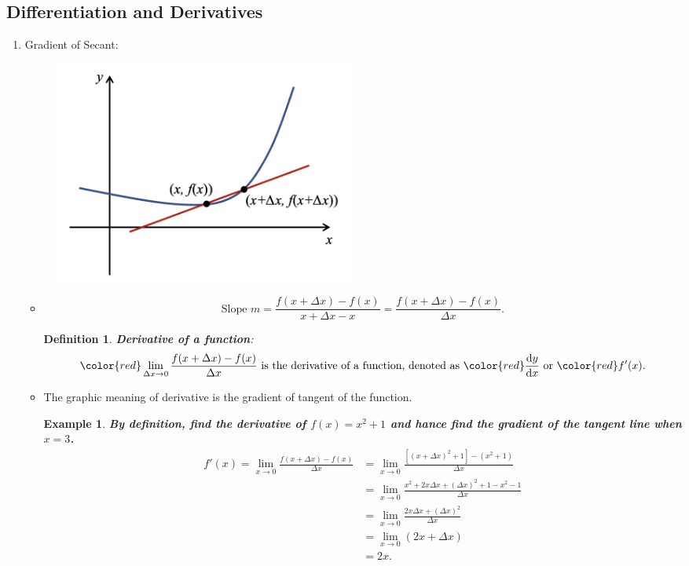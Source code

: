 \documentclass[12pt, a4paper]{article}
\newtheorem{definition}{Definition}[subsection]
\newtheorem{example}{Example}[subsection]
\begin{document}
\subsection{Differentiation and Derivatives}
\begin{enumerate}
    \item Gradient of Secant: 
    \begin{figure}[H]
        \centering 
        \includegraphics[width=0.5\textwidth]{Fig.5.3.jpg} 
    \end{figure}
    \begin{itemize}
        \item $$\text{Slope }m=\frac{f(x+\Delta x)-f(x)}{x+\Delta x-x}=\frac{f(x+\Delta x)-f(x)}{\Delta x}.$$
        \begin{definition}
            \textbf{\color{red}Derivative of a function}: 
            $${\color{red}\lim_{\Delta x\rightarrow 0}\frac{f(x+\Delta x)-f(x)}{\Delta x}}\text{ is the derivative of a function, denoted as } {\color{red}\frac{\mathrm{d}y}{\mathrm{d}x}}\text{ or }{\color{red}f'(x)}.$$
        \end{definition}
    \item The graphic meaning of derivative is the gradient of tangent of the function. 
    \begin{example}
        \textbf{By definition, find the derivative of $f(x)=x^2+1$ and hance find the gradient of the tangent line when $x=3$.}
        $$\begin{aligned}
            f'(x)=\lim_{x\to 0}\frac{f(x+\Delta x)-f(x)}{\Delta x}&=\lim_{x\to 0}\frac{\left[(x+\Delta x)^2+1\right]-(x^2+1)}{\Delta x}\\
            &=\lim_{x\to 0}\frac{x^2+2x\Delta x+(\Delta x)^2+1-x^2-1}{\Delta x}\\
            &=\lim_{x\to 0}\frac{2x\Delta x+(\Delta x)^2}{\Delta x}\\
            &=\lim_{x\to 0}\left(2x+\Delta x\right)\\
            &=2x.
        \end{aligned}$$

\end{example}
\end{itemize}
\end{enumerate}
\end{document}
